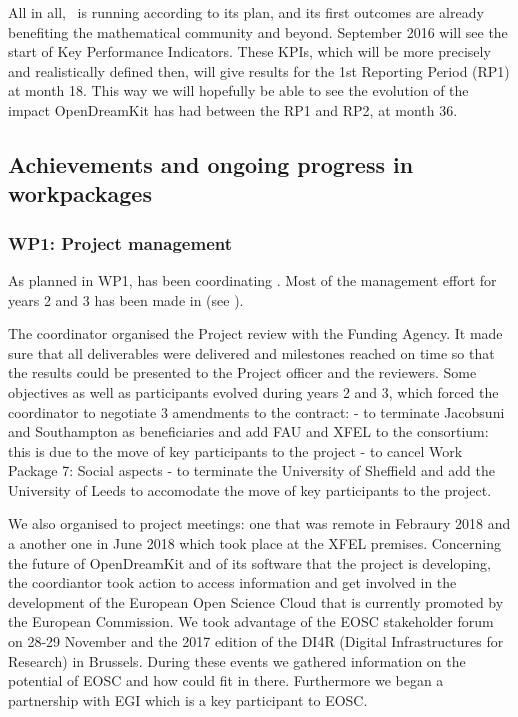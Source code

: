 \documentclass{deliverablereport}
\begin{document}
All in all, \ODK\ is running according to its plan, and its first
outcomes are already benefiting the mathematical community and
beyond. September 2016 will see the start of Key Performance
Indicators.  These KPIs, which will be more precisely and
realistically defined then, will give results for the 1st Reporting
Period (RP1) at month 18.  This way we will hopefully be able to see the
evolution of the impact OpenDreamKit has had between the RP1 and RP2,
at month 36.


\subsection{Achievements and ongoing progress in workpackages}

\subsubsection{WP1: Project management}

As planned in WP1,  has been coordinating \ODK.  Most of the
management effort for years 2 and 3 has been made in
 (see
).  

The coordinator organised the Project review with the Funding Agency. It made sure that all deliverables were delivered and milestones reached on time so that the results could be presented to the Project officer and the reviewers.
Some objectives as well as participants evolved during years 2 and 3, which forced the coordinator to negotiate 3 amendments to the contract:
- to terminate Jacobsuni and Southampton as beneficiaries and add FAU and XFEL to the consortium: this is due to the move of key participants to the project
- to cancel Work Package 7: Social aspects
- to terminate the University of Sheffield and add the University of Leeds to accomodate the move of key participants to the project.


We also organised to project meetings: one that was remote in Febraury 2018 and a another one in June 2018 which took place at the XFEL premises.
Concerning the future of OpenDreamKit and of its software that the project is developing, the coordiantor took action to access information and get involved in the development of the European Open Science Cloud that is currently promoted by the European Commission. We took advantage of the EOSC stakeholder forum on 28-29 November and the 2017 edition of the DI4R (Digital Infrastructures for Research) in Brussels. During these events we gathered information on the potential of EOSC and how \ODK could fit in there. Furthermore we began a partnership with EGI which is a key participant to EOSC.
\end{document}

